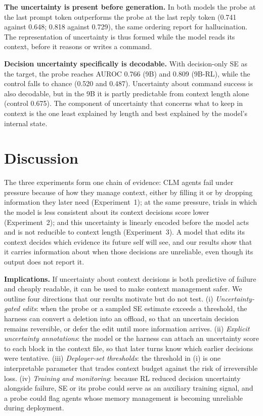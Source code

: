 \documentclass{article}
\begin{document}
\textbf{The uncertainty is present before generation.} In both models the probe at the last prompt token outperforms the probe at the last reply token (0.741 against 0.648; 0.818 against 0.729), the same ordering \citet{kossen2024sep} report for hallucination.
The representation of uncertainty is thus formed while the model reads its context, before it reasons or writes a command.

\textbf{Decision uncertainty specifically is decodable.} With decision-only SE as the target, the probe reaches AUROC 0.766 (9B) and 0.809 (9B-RL), while the control falls to chance (0.520 and 0.487).
Uncertainty about command success is also decodable, but in the 9B it is partly predictable from context length alone (control 0.675).
The component of uncertainty that concerns what to keep in context is the one least explained by length and best explained by the model's internal state.

\section{Discussion}
\label{sec:discussion}

The three experiments form one chain of evidence: CLM agents fail under pressure because of how they manage context, either by filling it or by dropping information they later need (Experiment~1); at the same pressure, trials in which the model is less consistent about its context decisions score lower (Experiment~2); and this uncertainty is linearly encoded before the model acts and is not reducible to context length (Experiment~3).
A model that edits its context decides which evidence its future self will see, and our results show that it carries information about when those decisions are unreliable, even though its output does not report it.


\textbf{Implications.} If uncertainty about context decisions is both predictive of failure and cheaply readable, it can be used to make context management safer.
We outline four directions that our results motivate but do not test.
(i) \emph{Uncertainty-gated edits}: when the probe or a sampled SE estimate exceeds a threshold, the harness can convert a deletion into an offload, so that an uncertain decision remains reversible, or defer the edit until more information arrives.
(ii) \emph{Explicit uncertainty annotations}: the model or the harness can attach an uncertainty score to each block in the context file, so that later turns know which earlier decisions were tentative.
(iii) \emph{Deployer-set thresholds}: the threshold in (i) is one interpretable parameter that trades context budget against the risk of irreversible loss.
(iv) \emph{Training and monitoring}: because RL reduced decision uncertainty alongside failure, SE or its probe could serve as an auxiliary training signal, and a probe could flag agents whose memory management is becoming unreliable during deployment.
\end{document}
